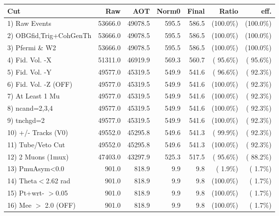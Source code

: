  \begin{table}[h!]\centering
 \begin{tabular}{||l||r|r|r|r|r|r||}
 \hline
 \hline
 Cut & Raw & AOT & Norm0 & Final & Ratio & eff.       \\
 \hline
  1) Raw Events           &      53666.0 &      49078.5 &        595.5 &        586.5 & (100.0\%) & (100.0\%) \\
  2) OBGfid,Trig+CohGenTh &      53666.0 &      49078.5 &        595.5 &        586.5 & (100.0\%) & (100.0\%) \\
  3) Pfermi \& W2         &      53666.0 &      49078.5 &        595.5 &        586.5 & (100.0\%) & (100.0\%) \\
  4) Fid. Vol. -X         &      51311.0 &      46919.9 &        569.3 &        560.7 & ( 95.6\%) & ( 95.6\%) \\
  5) Fid. Vol. -Y         &      49577.0 &      45319.5 &        549.9 &        541.6 & ( 96.6\%) & ( 92.3\%) \\
  6) Fid. Vol. -Z (OFF)   &      49577.0 &      45319.5 &        549.9 &        541.6 & (100.0\%) & ( 92.3\%) \\
  7) At Least 1 Mu        &      49577.0 &      45319.5 &        549.9 &        541.6 & (100.0\%) & ( 92.3\%) \\
  8) ncand=2,3,4          &      49577.0 &      45319.5 &        549.9 &        541.6 & (100.0\%) & ( 92.3\%) \\
  9) tnchgd=2             &      49577.0 &      45319.5 &        549.9 &        541.6 & (100.0\%) & ( 92.3\%) \\
 10) +/- Tracks (V0)      &      49552.0 &      45295.8 &        549.6 &        541.3 & ( 99.9\%) & ( 92.3\%) \\
 11) Tube/Veto Cut        &      49552.0 &      45295.8 &        549.6 &        541.3 & (100.0\%) & ( 92.3\%) \\
 12) 2 Muons (1mux)       &      47403.0 &      43297.9 &        525.3 &        517.5 & ( 95.6\%) & ( 88.2\%) \\
 13) PmuAsym<0.0          &        901.0 &        818.9 &          9.9 &          9.8 & (  1.9\%) & (  1.7\%) \\
 14) Theta$<$2.62 rad     &        901.0 &        818.9 &          9.9 &          9.8 & (100.0\%) & (  1.7\%) \\
 15) Pt+wrt- $>$0.05      &        901.0 &        818.9 &          9.9 &          9.8 & (100.0\%) & (  1.7\%) \\
 16) Mee $>$ 2.0  (OFF)   &        901.0 &        818.9 &          9.9 &          9.8 & (100.0\%) & (  1.7\%) \\

\end{tabular}
\end{table}
